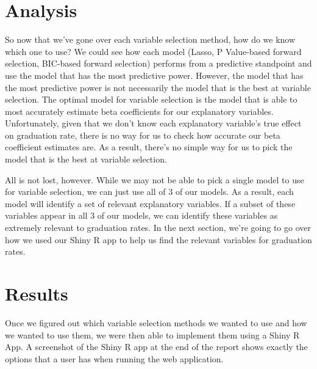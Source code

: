\documentclass{article}
\begin{document}
\section{Analysis}
So now that we've gone over each variable selection method, how do we know which one to use? We could see how each model (Lasso, P Value-based forward selection, BIC-based forward selection) performs from a predictive standpoint and use the model that has the most predictive power. However, the model that has the most predictive power is not necessarily the model that is the best at variable selection. The optimal model for variable selection is the model that is able to most accurately estimate beta coefficients for our explanatory variables. Unfortunately, given that we don't know each explanatory variable's true effect on graduation rate, there is no way for us to check how accurate our beta coefficient estimates are. As a result, there's no simple way for us to pick the model that is the best at variable selection.

All is not lost, however. While we may not be able to pick a single model to use for variable selection, we can just use all of 3 of our models. As a result, each model will identify a set of relevant explanatory variables. If a subset of these variables appear in all 3 of our models, we can identify these variables as extremely relevant to graduation rates. In the next section, we're going to go over how we used our Shiny R app to help us find the relevant variables for graduation rates.


\section{Results}
Once we figured out which variable selection methods we wanted to use and how we wanted to use them, we were then able to implement them using a Shiny R App. A screenshot of the Shiny R app at the end of the report shows exactly the options that a user has when running the web application.
\end{document}
